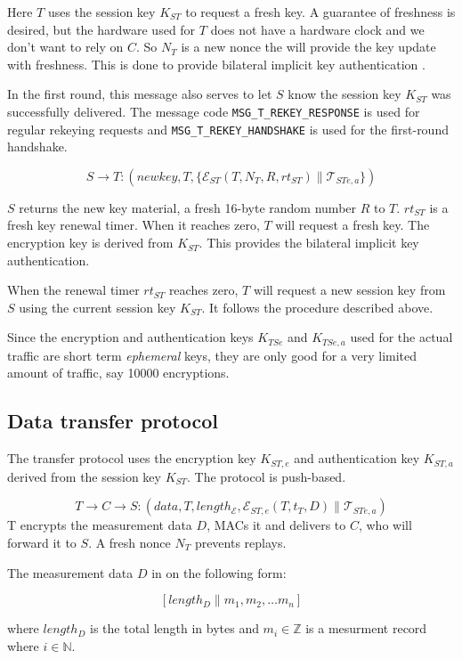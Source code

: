 Here $T$ uses the session key $K_{ST}$ to request a fresh key. A
guarantee of freshness is desired, but the hardware used for $T$ does
not have a hardware clock and we don't want to rely on $C$. So $N_T$
is a new nonce the will provide the key update with freshness. This is
done to provide bilateral implicit key authentication
\cite[pp.498]{menzes1996}.

In the first round, this message also serves to let $S$ know the
session key $K_{ST}$ was successfully delivered. The message code
\texttt{MSG\_T\_REKEY\_RESPONSE} is used for regular rekeying requests
and \texttt{MSG\_T\_REKEY\_HANDSHAKE} is used for the first-round handshake.

\[
S \rightarrow T: (newkey,T, \{ \mathcal{E}_{ST}(T,N_T,R,rt_{ST}) \parallel \mathcal{T}_{STe,a} \} )
\]

$S$ returns the new key material, a fresh 16-byte random number $R$ to
$T$.  $rt_{ST}$ is a fresh key renewal timer. When it reaches zero,
$T$ will request a fresh key. The encryption key is derived from
$K_{ST}$. This provides the bilateral implicit key authentication.

When the renewal timer $rt_{ST}$ reaches zero, $T$ will request a new
session key from $S$ using the current session key $K_{ST}$. It
follows the procedure described above.

Since the encryption and authentication keys $K_{TSe}$ and $K_{TSe,a}$
used for the actual traffic are short term \textit{ephemeral} keys,
they are only good for a very limited amount of traffic, say 10000
encryptions.

\subsection{Data transfer protocol}

The transfer protocol uses the encryption key $K_{ST,e}$ and authentication key $K_{ST,a}$
derived from the session key $K_{ST}$. The protocol is push-based.

\[
T \rightarrow C \rightarrow S: (\textit{data},T,length_{\mathcal{E}},\mathcal{E}_{ST,e}(T,t_T,D) \parallel \mathcal{T}_{STe,a})
\]
T encrypts the measurement data $D$, MACs it and delivers to
$C$, who will forward it to $S$. A fresh nonce $N_T$ prevents
replays.

The measurement data $D$ in on the following form:

\[
[ length_D \parallel m_1, m_2, \dots  m_n ]
\]

where $length_D$ is the total length in bytes and $m_i \in \mathbb{Z}$ is a mesurment
record where $i \in \mathbb{N}$. 


